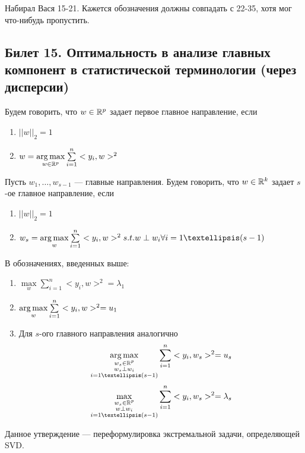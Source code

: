 
{\color{blue} Набирал Вася 15-21. Кажется обозначения должны совпадать с 22-35, хотя мог что-нибудь пропустить.}
\subsection{Билет 15. Оптимальность в анализе главных компонент в статистической терминологии (через дисперсии)}

\begin{dfn} Будем говорить, что $w \in \mathbb{R}^p$ задает первое главное направление, если 
\begin{enumerate}
\item $||w||_2 = 1$
\item $w = \operatorname*{arg\,max}\limits_{w \in \mathbb{R}^p}\sum \limits_{i=1}^n <y_i, w>^2 $
\end{enumerate}
\end{dfn}



\begin{dfn} Пусть $w_1, …, w_{s-1}$ — главные направления. Будем говорить, что $w \in \mathbb{R}^k$ задает $s$-ое главное направление, если 
\begin{enumerate}
\item $||w||_2 = 1$
\item $w_s = \argmax\limits_{w}\sum \limits_{i=1}^n <y_i, w>^2 s.t. w \perp w_i \forall i=1…(s-1) $
\end{enumerate}
\end{dfn}


\begin{thm}
В обозначениях, введенных выше:

\begin{enumerate}
\item $\max\limits_{w}\sum \limits_{i=1}^n <y_i, w>^2  = \lambda_1$
\item $ \operatorname*{arg\,max}\limits_{w}\sum \limits_{i=1}^n <y_i, w>^2 = u_1$
\item Для $s$-ого главного направления аналогично 
$$ \argmax\limits_{\substack{w_s \in \R^p \\ w_s \perp w_i\\ i=1…(s-1)}}\sum \limits_{i=1}^n <y_i, w_s>^2 = u_s$$
$$ \max\limits_{\substack{w_s \in \R^p\\ w \perp w_i\\ i=1…(s-1)}}\sum \limits_{i=1}^n <y_i, w_s>^2 = \lambda_s$$
\end{enumerate}
\end{thm}

Данное утверждение — переформулировка экстремальной задачи, определяющей SVD.

